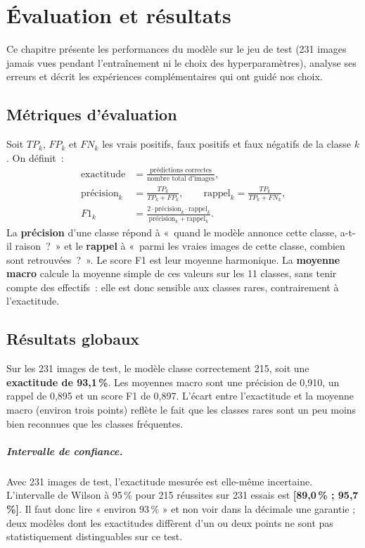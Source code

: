 \chapter{Évaluation et résultats}\label{chap:resultats}

Ce chapitre présente les performances du modèle sur le jeu de test (231 images jamais vues pendant l’entraînement ni le choix des hyperparamètres), analyse ses erreurs et décrit les expériences complémentaires qui ont guidé nos choix.

\section{Métriques d’évaluation}

Soit $TP_k$, $FP_k$ et $FN_k$ les vrais positifs, faux positifs et faux négatifs de la classe $k$. On définit~:
\begin{align}
  \text{exactitude} &= \frac{\text{prédictions correctes}}{\text{nombre total d’images}}, \\
  \text{précision}_k &= \frac{TP_k}{TP_k+FP_k}, \qquad
  \text{rappel}_k = \frac{TP_k}{TP_k+FN_k}, \\
  F1_k &= \frac{2\cdot \text{précision}_k\cdot\text{rappel}_k}{\text{précision}_k+\text{rappel}_k}.
\end{align}
La \textbf{précision} d’une classe répond à «~quand le modèle annonce cette classe, a-t-il raison~?~» et le \textbf{rappel} à «~parmi les vraies images de cette classe, combien sont retrouvées~?~». Le score F1 est leur moyenne harmonique. La \textbf{moyenne macro} calcule la moyenne simple de ces valeurs sur les 11 classes, sans tenir compte des effectifs~: elle est donc sensible aux classes rares, contrairement à l’exactitude.

\section{Résultats globaux}

Sur les 231 images de test, le modèle classe correctement 215, soit une \textbf{exactitude de 93,1\,\%}. Les moyennes macro sont une précision de 0,910, un rappel de 0,895 et un score F1 de 0,897. L’écart entre l’exactitude et la moyenne macro (environ trois points) reflète le fait que les classes rares sont un peu moins bien reconnues que les classes fréquentes.

\paragraph{Intervalle de confiance.} Avec 231 images de test, l’exactitude mesurée est elle-même incertaine. L’intervalle de Wilson à 95\,\% pour 215 réussites sur 231 essais est \textbf{[89,0\,\% ; 95,7\,\%]}. Il faut donc lire « environ 93\,\% » et non voir dans la décimale une garantie ; deux modèles dont les exactitudes diffèrent d’un ou deux points ne sont pas statistiquement distinguables sur ce test.

